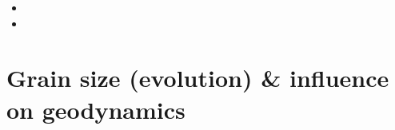 \begin{scriptsize}
\begin{itemize}
\item[\twothousandfifteen]
\item[\twothousandnineteen]
\end{itemize}
\end{scriptsize}

\section{Grain size (evolution) \& influence on geodynamics}
\label{sec:topics:gsev}

